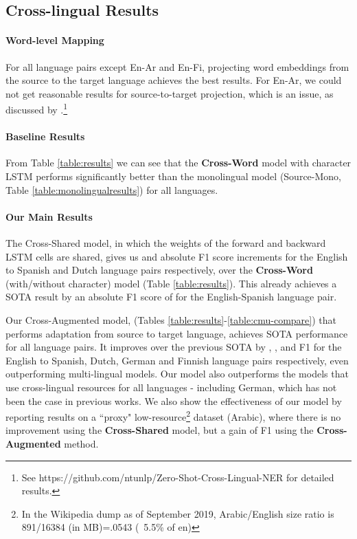 \documentclass[letterpaper]{article} \usepackage{aaai20}  \usepackage{times}  \usepackage{helvet} \usepackage{courier}  \usepackage[hyphens]{url}  \usepackage{graphicx} \urlstyle{rm} \def\UrlFont{\rm}  \usepackage{graphicx}  \frenchspacing  \setlength{\pdfpagewidth}{8.5in}  \setlength{\pdfpageheight}{11in}
\newcommand{\citet}[1]{\citeauthor{#1} \shortcite{#1}}
\begin{document}
\subsection{Cross-lingual Results}


\paragraph{Word-level Mapping}

For all language pairs except En-Ar and En-Fi, projecting word embeddings from the source to the target language achieves the best results. For En-Ar, we could not get reasonable results for source-to-target projection, which is an issue, as discussed by \citet{Non_adv_word_trans}.\footnote{See https://github.com/ntunlp/Zero-Shot-Cross-Lingual-NER for detailed results.}


\paragraph{Baseline Results}

From Table \ref{table:results} we can see that the \textbf{Cross-Word} model with character LSTM performs significantly better than the monolingual model (Source-Mono, Table \ref{table:monolingualresults}) for all languages.


\paragraph{Our Main Results}

The Cross-Shared model, in which the weights of the forward and backward LSTM cells are shared, gives us  and  absolute F1 score increments for the English to Spanish and Dutch  language pairs respectively, over the \textbf{Cross-Word} (with/without character) model  (Table \ref{table:results}). This already achieves a SOTA result by an absolute F1 score of  for the English-Spanish language pair.

Our Cross-Augmented model, (Tables \ref{table:results}-\ref{table:cmu-compare}) that performs adaptation from source to target language, achieves SOTA performance for all language pairs. It improves over the previous SOTA by , ,  and  F1 for the English to Spanish, Dutch, German and Finnish language pairs respectively, even outperforming multi-lingual models.  Our model also outperforms the models that use cross-lingual resources for all languages - including German, which has not been the case in previous works. We also show the effectiveness of our model by reporting results on a ``proxy" low-resource\footnote{In the Wikipedia dump as of September 2019, Arabic/English size ratio is 891/16384 (in MB)=.0543 (~5.5\% of en) } dataset (Arabic), where there is no improvement using the \textbf{Cross-Shared} model, but a gain of  F1 using the \textbf{Cross-Augmented} method.
\end{document}
